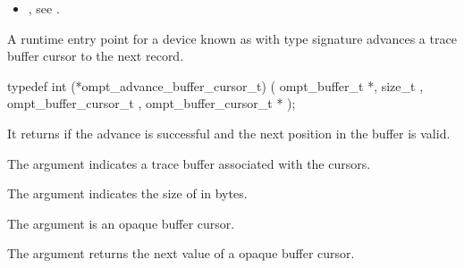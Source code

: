 \argdesc

\devicedesc



\crossreferences
\begin{itemize}
\item {},
see .
\end{itemize}

\label{sec:ompt_advance_buffer_cursor_t}


\summary
A runtime entry point for a device known as 
with type signature 
advances a trace buffer cursor to the next record.

\format
\begin{ccppspecific}
\begin{omptInquiry}
typedef int (*ompt_advance_buffer_cursor_t) (
  ompt_buffer_t *,
  size_t ,
  ompt_buffer_cursor_t ,
  ompt_buffer_cursor_t *
);
\end{omptInquiry}
\end{ccppspecific}

\descr
It returns  if the advance is successful and the next
position in the buffer is valid.

\argdesc

\devicedesc

The argument  indicates a trace buffer associated
with the cursors.

The argument  indicates the size of  in
bytes.

The argument  is an opaque buffer cursor.

The argument  returns the next value of a opaque buffer cursor.


